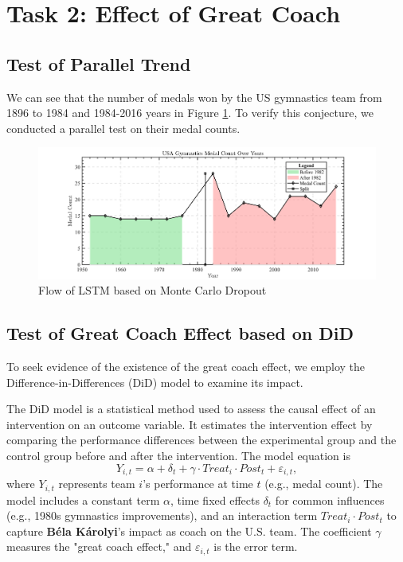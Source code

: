 \documentclass{mcmthesis}
\begin{document}
\section{Task 2: Effect of Great Coach}



\subsection{Test of Parallel Trend }

We can see that the number of medals won by the US gymnastics team from 1896 to 1984 and 1984-2016 years in Figure \ref{fig:USA-GYM}. To verify this conjecture, we conducted a parallel test on their medal counts.
\begin{figure}[H]
	\centering
	\includegraphics[width=0.7\linewidth]{fig/USA-GYM.png}
	\caption{Flow of LSTM based on Monte Carlo Dropout}
	\label{fig:USA-GYM}
\end{figure}

\subsection{Test of Great Coach Effect based on DiD}

To seek evidence of the existence of the great coach effect, we employ the Difference-in-Differences (DiD) model to examine its impact.

The DiD model is a statistical method used to assess the causal effect of an intervention on an outcome variable. It estimates the intervention effect by comparing the performance differences between the experimental group and the control group before and after the intervention. The model equation is 
\begin{equation}
	Y_{i,t}=\alpha+\delta_t+\gamma \cdot Treat_i \cdot Post_t + \varepsilon_{i,t},
\end{equation}
where \( Y_{i,t} \) represents team \( i \)'s performance at time \( t \) (e.g., medal count). The model includes a constant term \(\alpha\), time fixed effects \(\delta_t\) for common influences (e.g., 1980s gymnastics improvements), and an interaction term \( Treat_i \cdot Post_t \) to capture \textbf{Béla Károlyi}'s impact as coach on the U.S. team. The coefficient \(\gamma\) measures the "great coach effect," and \(\varepsilon_{i,t}\) is the error term.
\end{document}
